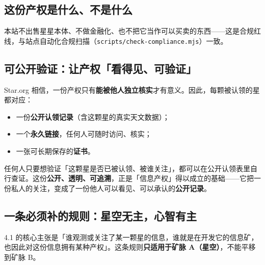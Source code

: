 \documentclass[11pt,fontset=none]{ctexart}
\begin{document}
\subsection{这份产权是什么、不是什么}


本站不出售星星本体、不做金融化、也不把它当作可以买卖的东西——这是合规红线，与站点自动化合规扫描（\texttt{scripts/check-compliance.mjs}）一致。

\subsection{可公开验证：让产权「看得见、可验证」}

Star.org 相信，一份产权只有\textbf{能被他人独立核实}才有意义。因此，每颗被认领的星都对应：

\begin{itemize}
  \item 一份\textbf{公开认领记录}（含这颗星的真实天文数据）；
  \item 一个\textbf{永久链接}，任何人可随时访问、核实；
  \item 一张可长期保存的\textbf{证书}。
\end{itemize}

任何人只要想验证「这颗星是否已被认领、被谁关注」，都可以在公开认领表里自行查证。这份\textbf{公开、透明、可追溯}，正是「信息产权」得以成立的基础——它把一份私人的关注，变成了一份他人可以看见、可以承认的\textbf{公开记录}。

\subsection{一条必须补的规则：星空无主，心智有主}

4.1 的核心主张是「谁观测或关注了某一颗星的信息，谁就是在开发它的信息矿，也因此对这份信息拥有某种产权」。这条规则\textbf{只适用于矿脉 A（星空）}，不能平移到矿脉 B。
\end{document}
